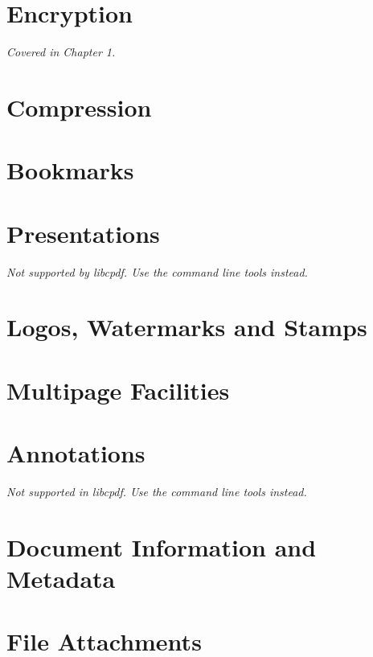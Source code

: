 \documentclass[a4paper]{memoir}
\begin{document}
\chapter{Encryption}
\textit{Covered in Chapter 1.}

\chapter{Compression}
\begin{small}
\end{small}

\chapter{Bookmarks}
\begin{small}
\end{small}

\chapter{Presentations}
\textit{Not supported by libcpdf. Use the command line tools instead.}

\chapter{Logos, Watermarks and Stamps}
\begin{small}
\end{small}

\chapter{Multipage Facilities}

\begin{small}
\end{small}

\chapter{Annotations}
\textit{Not supported in libcpdf. Use the command line tools instead.}

\chapter{Document Information and Metadata}
\begin{small}
\end{small}

\chapter{File Attachments}
\begin{small}
\end{small}
\end{document}
